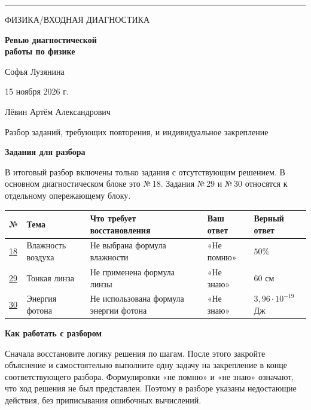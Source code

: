 \documentclass[a4paper,11pt]{article}
\begin{document}
\thispagestyle{empty}
\vspace*{25mm}
{\color{accent}\rule{\linewidth}{1pt}}\par\vspace{16mm}
{\large\textcolor{darkaccent}{ФИЗИКА\quad/\quad ВХОДНАЯ ДИАГНОСТИКА}}\par\vspace{17mm}
{\fontsize{25}{32}\selectfont\bfseries Ревью диагностической\\[2mm] работы по физике}\par\vspace{14mm}
{\Large Софья Лузянина}\par\vspace{16mm}
{\large\textcolor{softgray}{15 ноября 2026 г.}}\par
\vfill
{\large Лёвин Артём Александрович}\par\vspace{6mm}
{\small\textcolor{softgray}{Разбор заданий, требующих повторения, и индивидуальное закрепление}}\par\vspace{25mm}
\begin{center}
\end{center}
\clearpage

{\Large\bfseries\textcolor{darkaccent}{Задания для разбора}}\par\smallskip
В итоговый разбор включены только задания с отсутствующим решением. В основном диагностическом блоке это №\,18. Задания №\,29 и №\,30 относятся к отдельному опережающему блоку.
\medskip
\small
\begin{tabularx}{\linewidth}{@{}p{10mm}p{27mm}X p{23mm}p{36mm}@{}}
\toprule
\textbf{№} & \textbf{Тема} & \textbf{Что требует восстановления} & \textbf{Ваш ответ} & \textbf{Верный ответ}\\
\midrule
\hyperref[task:18]{18} & Влажность воздуха & Не выбрана формула влажности & «Не помню» & $50\%$\\
\addlinespace
\hyperref[task:29]{29} & Тонкая линза & Не применена формула линзы & «Не знаю» & $60$ см\\
\addlinespace
\hyperref[task:30]{30} & Энергия фотона & Не использована формула энергии фотона & «Не знаю» & $3{,}96\cdot10^{-19}$ Дж\\
\bottomrule
\end{tabularx}
\normalsize
\vspace{12mm}
{\bfseries\textcolor{darkaccent}{Как работать с разбором}}\par
Сначала восстановите логику решения по шагам. После этого закройте объяснение и самостоятельно выполните одну задачу на закрепление в конце соответствующего разбора.
\vspace{5mm}
\textcolor{softgray}{Формулировки «не помню» и «не знаю» означают, что ход решения не был представлен. Поэтому в разборе указаны недостающие действия, без приписывания ошибочных вычислений.}
\clearpage
\end{document}
